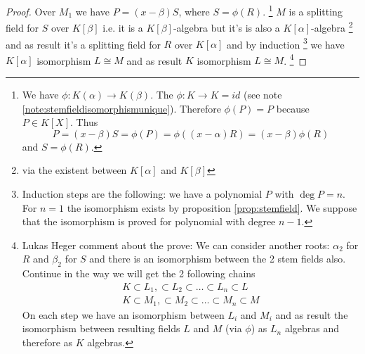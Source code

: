 \begin{theorem}
\begin{proof}
    Over $M_1$ we have $P = (x - \beta) S$, where
    $S = \phi\left(R\right)$.
    \footnote{
      We have $\phi: K\left(\alpha\right) \to
      K\left(\beta\right)$. The $\phi: K \to K = id$ (see note
      \ref{note:stemfieldisomorphismunique}).
      Therefore
      $\phi\left(P\right) = P$ because $P \in K\left[X\right]$.
      Thus
      \[
      P = (x - \beta) S = \phi\left(P\right) =
      \phi\left((x - \alpha) R\right) =
      (x - \beta) \phi\left(R\right)
      \]
      and $S = \phi\left(R\right)$.
    }
    $M$ is a splitting field for $S$ over $K\left[\beta\right]$
    i.e. it is a $K\left[\beta\right]$-algebra but it's is also
    a $K\left[\alpha\right]$-algebra
    \footnote{
      via
      the existent 
      between $K\left[\alpha\right]$ and $K\left[\beta\right]$
    }
    and as 
    result it's a splitting field for $R$ over $K\left[\alpha\right]$
    and by induction
    \footnote{
      Induction steps are the following: we have a polynomial $P$ with
      $\deg P = n$. For $n=1$ the isomorphism exists by proposition
      \ref{prop:stemfield}.
      We suppose that the isomorphism is proved for
      polynomial with degree $n-1$.
    }
    we have $K\left[\alpha\right]$ isomorphism $L \cong M$ and as
    result $K$ isomorphism $L \cong M$.
    \footnote{
      Lukas Heger comment about the prove:
      We can consider 
      another roots: $\alpha_2$ for $R$ and $\beta_2$ for $S$
      and there is an isomorphism between the 2 stem fields
      also. Continue in the way we will get the 2 following chains
      \begin{eqnarray}
        K \subset L_1, \subset L_2 \subset \dots \subset L_n \subset L
        \nonumber \\
        K \subset M_1, \subset M_2 \subset \dots \subset M_n \subset M
        \nonumber
      \end{eqnarray}
      On each step we have an isomorphism between $L_i$ and $M_i$ and as
      result the isomorphism between resulting fields $L$ and $M$ (via
      $\phi$) as $L_n$ algebras and therefore as $K$ algebras. 
    }
  \end{proof}
\end{theorem}

